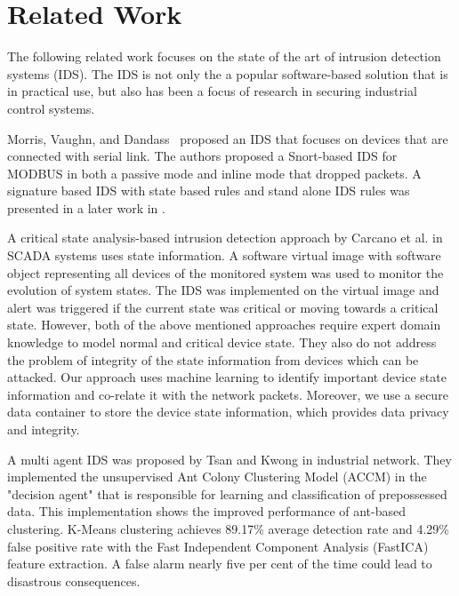 \documentclass[conference]{IEEEtran}
\begin{document}
\section{Related Work}
The following related work focuses on the state of the art of intrusion detection systems (IDS).  The IDS is not only the a popular software-based solution that is in practical use, but also has been a focus of research in securing industrial control systems.

\par Morris, Vaughn, and Dandass~\cite{c2} proposed an IDS that focuses on devices that are connected with serial link. The authors proposed a Snort-based IDS for MODBUS in both a passive mode and inline mode that dropped packets. 
A signature based IDS with state based rules and stand alone IDS rules was presented in a later work in \cite{c9}.
\par A critical state analysis-based intrusion detection approach by Carcano et al. \cite{c4} in SCADA systems uses state information. A software virtual image with software object representing all devices of the monitored system was used to monitor the evolution of system states. The IDS was implemented on the virtual image and alert was triggered if the current state was critical or moving towards a critical state.
However, both of the above mentioned approaches require expert domain knowledge to model normal and critical device state. They also do not address the problem of integrity of the state information from devices which can be attacked. Our approach uses machine learning to identify important device state information and co-relate it with the network packets. Moreover, we use a secure data container to store the device state information, which provides data privacy and integrity.
\par A multi agent IDS was proposed by Tsan and Kwong \cite{c3} in industrial network. They implemented the unsupervised Ant Colony Clustering Model (ACCM) in the "decision agent" that is responsible for learning and classification of prepossessed data. This implementation shows the improved performance of ant-based clustering. K-Means clustering achieves 89.17\% average detection rate and  4.29\% false positive rate with the Fast Independent Component Analysis (FastICA) feature extraction. A false alarm nearly five per cent of the time could lead to disastrous consequences.
\end{document}
